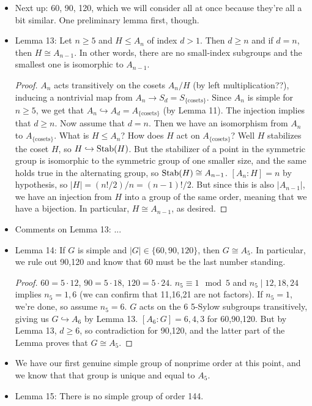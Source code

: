 \documentclass[../notes.tex]{subfiles}
\begin{document}
\begin{itemize}
\begin{proof}
    \end{proof}
    \item Next up: 60, 90, 120, which we will consider all at once because they're all a bit similar. One preliminary lemma first, though.
    \item Lemma 13: Let $n\geq 5$ and $H\leq A_n$ of index $d>1$. Then $d\geq n$ and if $d=n$, then $H\cong A_{n-1}$. In other words, there are no small-index subgroups and the smallest one is isomorphic to $A_{n-1}$.
    \begin{proof}
        $A_n$ acts transitively on the cosets $A_n/H$ (by left multiplication??), inducing a nontrivial map from $A_n\to S_d=S_{\{\text{cosets}\}}$. Since $A_n$ is simple for $n\geq 5$, we get that $A_n\hookrightarrow A_d=A_{\{\text{cosets}\}}$ (by Lemma 11). The injection implies that $d\geq n$. Now assume that $d=n$. Then we have an isomorphism from $A_n$ to $A_{\{\text{cosets}\}}$. What is $H\leq A_n$? How does $H$ act on $A_{\{\text{cosets}\}}$? Well $H$ stabilizes the coset $H$, so $H\hookrightarrow\operatorname{Stab}(H)$. But the stabilizer of a point in the symmetric group is isomorphic to the symmetric group of one smaller size, and the same holds true in the alternating group, so $\operatorname{Stab}(H)\cong A_{n-1}$. $[A_n:H]=n$ by hypothesis, so $|H|=(n!/2)/n=(n-1)!/2$. But since this is also $|A_{n-1}|$, we have an injection from $H$ into a group of the same order, meaning that we have a bijection. In particular, $H\cong A_{n-1}$, as desired.
    \end{proof}
    \item Comments on Lemma 13: ...
    \item Lemma 14: If $G$ is simple and $|G|\in\{60,90,120\}$, then $G\cong A_5$. In particular, we rule out 90,120 and know that 60 must be the last number standing.
    \begin{proof}
        $60=5\cdot 12$, $90=5\cdot 18$, $120=5\cdot 24$. $n_5\equiv 1\mod 5$ and $n_5\mid 12,18,24$ implies $n_5=1,6$ (we can confirm that 11,16,21 are not factors). If $n_5=1$, we're done, so assume $n_5=6$. $G$ acts on the 6 5-Sylow subgroups transitively, giving us $G\hookrightarrow A_6$ by Lemma 13. $[A_6:G]=6,4,3$ for 60,90,120. But by Lemma 13, $d\geq 6$, so contradiction for 90,120, and the latter part of the Lemma proves that $G\cong A_5$.
    \end{proof}
    \item We have our first genuine simple group of nonprime order at this point, and we know that that group is unique and equal to $A_5$.
    \item Lemma 15: There is no simple group of order 144.

\end{itemize}
\end{document}

